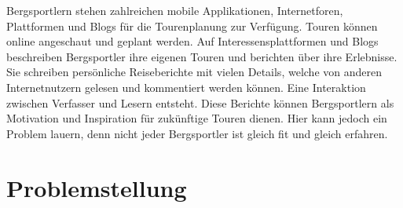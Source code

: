 Bergsportlern stehen zahlreichen mobile Applikationen, Internetforen, Plattformen und Blogs für die Tourenplanung zur Verfügung. Touren können online angeschaut und geplant werden. Auf Interessensplattformen und Blogs beschreiben Bergsportler ihre eigenen Touren und berichten über ihre  Erlebnisse. Sie schreiben persönliche Reiseberichte mit vielen Details, welche von anderen Internetnutzern gelesen und kommentiert werden können. Eine Interaktion zwischen Verfasser und Lesern entsteht. Diese Berichte können Bergsportlern als Motivation und Inspiration für zukünftige Touren dienen. Hier kann jedoch ein Problem lauern, denn nicht jeder Bergsportler ist gleich fit und gleich erfahren.


\section{Problemstellung}


